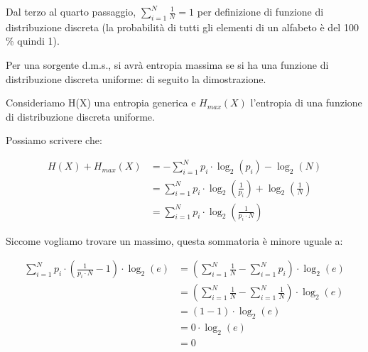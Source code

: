 Dal terzo al quarto passaggio, $\sum_{i = 1}^{N} \frac{1}{N} = 1$ per definizione di funzione di distribuzione discreta (la probabilità di tutti gli elementi di un alfabeto è del 100 \% quindi 1). \newline 

Per una sorgente d.m.s., si avrà entropia massima se si ha una funzione di distribuzione discreta uniforme: di seguito la dimostrazione. \newline 

Consideriamo H(X) una entropia generica e $H_{max} (X)$ l'entropia di una funzione di distribuzione discreta uniforme. \newline 

Possiamo scrivere che: 

{
    \Large 
    \begin{equation}
        \begin{split}
            H(X) + H_{max} (X) 
            &=
            -
            \sum_{i = 1}^{N} p_i \cdot \log_{2} \left( p_i \right)
            - \log_{2} (N)
            \\
            &= 
            \sum_{i = 1}^{N} p_i \cdot \log_{2} \left( \frac{1}{p_i} \right)
            +
            \log_{2} \left(\frac{1}{N} \right)
            \\
            &= 
            \sum_{i = 1}^{N} p_i \cdot \log_{2} \left( \frac{1}{p_i \cdot N} \right)
        \end{split} 
    \end{equation}
}

Siccome vogliamo trovare un massimo, questa sommatoria è minore uguale a: 

{
    \Large 
    \begin{equation}
        \begin{split}
            \sum_{i = 1}^{N} p_i \cdot \left( \frac{1}{p_i \cdot N} - 1\right) \cdot \log_{2} \left( e \right)
            &= 
            \left( \sum_{i = 1}^{N} \frac{1}{N} - \sum_{i = 1}^{N} p_i\right) \cdot \log_{2} \left( e \right)
            \\
            &= 
            \left( \sum_{i = 1}^{N} \frac{1}{N} - \sum_{i = 1}^{N} \frac{1}{N}\right) \cdot \log_{2} \left( e \right) 
            \\
            &= 
            (1- 1) \cdot \log_{2} \left( e \right)
            \\
            &= 
            0 \cdot \log_{2} \left( e \right)
            \\
            &= 
            0
        \end{split}
    \end{equation}
}

